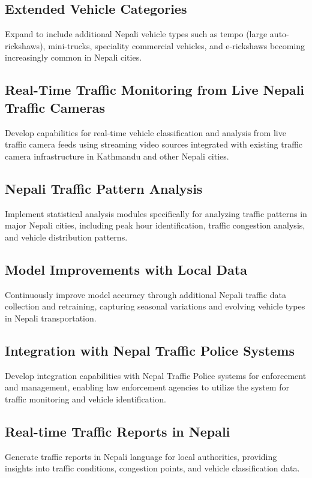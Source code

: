 \documentclass[12pt,a4paper]{report}
\begin{document}
\subsection{Extended Vehicle Categories}
Expand to include additional Nepali vehicle types such as tempo (large auto-rickshaws), mini-trucks, speciality commercial vehicles, and e-rickshaws becoming increasingly common in Nepali cities.

\subsection{Real-Time Traffic Monitoring from Live Nepali Traffic Cameras}
Develop capabilities for real-time vehicle classification and analysis from live traffic camera feeds using streaming video sources integrated with existing traffic camera infrastructure in Kathmandu and other Nepali cities.

\subsection{Nepali Traffic Pattern Analysis}
Implement statistical analysis modules specifically for analyzing traffic patterns in major Nepali cities, including peak hour identification, traffic congestion analysis, and vehicle distribution patterns.

\subsection{Model Improvements with Local Data}
Continuously improve model accuracy through additional Nepali traffic data collection and retraining, capturing seasonal variations and evolving vehicle types in Nepali transportation.

\subsection{Integration with Nepal Traffic Police Systems}
Develop integration capabilities with Nepal Traffic Police systems for enforcement and management, enabling law enforcement agencies to utilize the system for traffic monitoring and vehicle identification.

\subsection{Real-time Traffic Reports in Nepali}
Generate traffic reports in Nepali language for local authorities, providing insights into traffic conditions, congestion points, and vehicle classification data.
\end{document}
